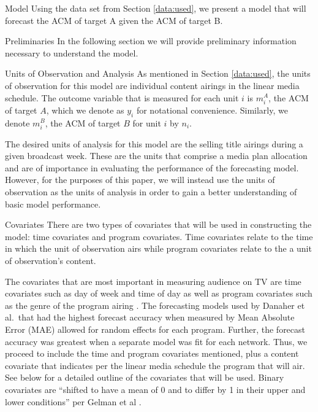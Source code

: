 \begin{chapter}{Model}
  Using the data set from Section \ref{data:used}, we present a model that will
  forecast the ACM of target A given the ACM of target B.

\begin{section}{Preliminaries}
  In the following section we will provide preliminary information necessary to
  understand the model.

  \begin{subsection}{Units of Observation and Analysis}
    As mentioned in Section \ref{data:used}, the units of observation for this model
    are individual content airings in the linear media schedule. The outcome
    variable that is measured for each unit $i$ is $m_i^A$, the ACM of target $A$, which we
    denote as $y_i$ for notational convenience. Similarly, we denote $m_i^B$, the ACM of
    target $B$ for unit $i$ by $n_i$.

    The desired units of analysis for this model are the selling title airings during a given broadcast week.
    These are the units that comprise a media plan allocation and are of importance in evaluating
    the performance of the forecasting model. However, for the purposes of this paper,
    we will instead use the units of observation as the units of analysis in order to gain
    a better understanding of basic model performance.
  \end{subsection}

  \begin{subsection}{Covariates}
    There are two types of covariates that will be used in constructing the model: time covariates and program
    covariates. Time covariates relate to the time in which the unit of observation airs
    while program covariates relate to the a unit of observation's content.

    The covariates that are most important in measuring audience on TV are time covariates
    such as day of week and time of day as well as program covariates such as the genre of
    the program airing \cite{tvforecasting}.
    The forecasting models used by Danaher et al.\ that had the highest forecast accuracy when measured by Mean Absolute Error (MAE)
    allowed for random effects for each program. Further, the forecast accuracy was greatest when a
    separate model was fit for each network.
    Thus, we proceed to include the time and program covariates mentioned, plus a content
    covariate that indicates per the linear media schedule the program that will air. See below
    for a detailed outline of the covariates that will be used. Binary
    covariates are ``shifted to have a mean of 0 and to differ by 1 in their upper and lower conditions'' per Gelman et al \cite{bda3}.


\end{subsection}
\end{section}
\end{chapter}
